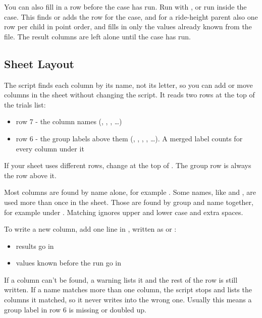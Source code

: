 You can also fill in a row before the case has run. Run  with , or run  inside the case. This finds or adds the row for the case, and for a ride-height parent also one row per child in point order, and fills in only the values already known from the  file. The result columns are left alone until the case has run.

\subsection{Sheet Layout}
The script finds each column by its name, not its letter, so you can add or move columns in the sheet without changing the script. It reads two rows at the top of the trials list:
\begin{itemize}
    \item row 7 - the column names (, , , \dots)
    \item row 6 - the group labels above them (, , , , \dots). A merged label counts for every column under it
\end{itemize}
If your sheet uses different rows, change  at the top of . The group row is always the row above it.

Most columns are found by name alone, for example . Some names, like  and , are used more than once in the sheet. Those are found by group and name together, for example  under . Matching ignores upper and lower case and extra spaces.

To write a new column, add one line in , written as  or :
\begin{itemize}
    \item results go in 
    \item values known before the run go in 
\end{itemize}

If a column can't be found, a warning lists it and the rest of the row is still written. If a name matches more than one column, the script stops and lists the columns it matched, so it never writes into the wrong one. Usually this means a group label in row 6 is missing or doubled up.

